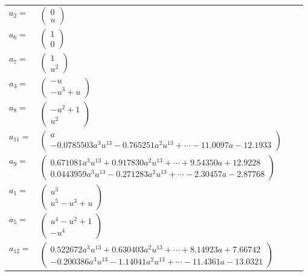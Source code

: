 \documentclass[1p]{elsarticle_modified}
\theoremstyle{definition}
\begin{document}
\begin{tabular}{m{7pt} m{180pt} m{7pt} m{180pt} }
\flushright $a_{2}=$&$\begin{pmatrix}0\\u\end{pmatrix}$ \\
\flushright $a_{6}=$&$\begin{pmatrix}1\\0\end{pmatrix}$ \\
\flushright $a_{7}=$&$\begin{pmatrix}1\\u^2\end{pmatrix}$ \\
\flushright $a_{3}=$&$\begin{pmatrix}- u\\- u^3+u\end{pmatrix}$ \\
\flushright $a_{8}=$&$\begin{pmatrix}- u^2+1\\u^2\end{pmatrix}$ \\
\flushright $a_{11}=$&$\begin{pmatrix}a\\-0.0785503 a^{3} u^{13}-0.765251 a^{2} u^{13}+\cdots-11.0097 a-12.1933\end{pmatrix}$ \\
\flushright $a_{9}=$&$\begin{pmatrix}0.671081 a^{3} u^{13}+0.917830 a^{2} u^{13}+\cdots+9.54350 a+12.9228\\0.0443959 a^{3} u^{13}-0.271283 a^{2} u^{13}+\cdots-2.30457 a-2.87768\end{pmatrix}$ \\
\flushright $a_{1}=$&$\begin{pmatrix}u^3\\u^5- u^3+u\end{pmatrix}$ \\
\flushright $a_{5}=$&$\begin{pmatrix}u^4- u^2+1\\- u^4\end{pmatrix}$ \\
\flushright $a_{12}=$&$\begin{pmatrix}0.522672 a^{3} u^{13}+0.630403 a^{2} u^{13}+\cdots+8.14923 a+7.66742\\-0.200386 a^{3} u^{13}-1.14041 a^{2} u^{13}+\cdots-11.4361 a-13.0321\end{pmatrix}$ \\

\end{tabular}
\end{document}
